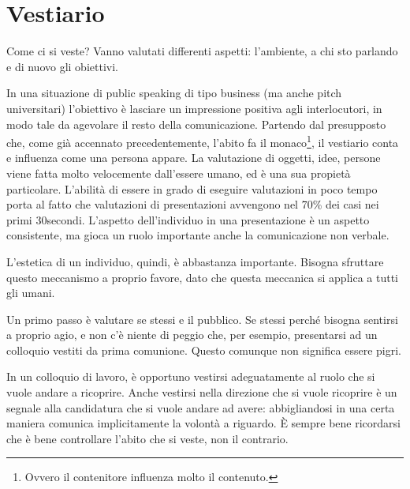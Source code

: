 \section{Vestiario}

Come ci si veste? Vanno valutati differenti aspetti: l'ambiente, a chi sto
parlando e di nuovo gli obiettivi.

In una situazione di public speaking di tipo business (ma anche pitch
universitari) l'obiettivo è lasciare un impressione positiva agli
interlocutori, in modo tale da agevolare il resto della comunicazione. Partendo
dal presupposto che, come già accennato precedentemente, l'abito fa il
monaco\footnote{Ovvero il contenitore influenza molto il contenuto.}, il
vestiario conta e influenza come una persona appare. La valutazione di oggetti,
idee, persone viene fatta molto velocemente dall'essere umano, ed è una sua
propietà particolare. L'abilità di essere in grado di eseguire valutazioni in
poco tempo porta al fatto che valutazioni di presentazioni avvengono nel 70\%
dei casi nei primi 30secondi. L'aspetto dell'individuo in una presentazione è
un aspetto consistente, ma gioca un ruolo importante anche la comunicazione non
verbale.

L'estetica di un individuo, quindi, è abbastanza importante. Bisogna sfruttare
questo meccanismo a proprio favore, dato che questa meccanica si applica a tutti
gli umani.

Un primo passo è valutare se stessi e il pubblico. Se stessi perché bisogna
sentirsi a proprio agio, e non c'è niente di peggio che, per esempio,
presentarsi ad un colloquio vestiti da prima comunione. Questo comunque non
significa essere pigri.

In un colloquio di lavoro, è opportuno vestirsi adeguatamente al ruolo che si
vuole andare a ricoprire. Anche vestirsi nella direzione che si vuole ricoprire
è un segnale alla candidatura che si vuole andare ad avere: abbigliandosi in
una certa maniera comunica implicitamente la volontà a riguardo. È sempre bene
ricordarsi che è bene controllare l'abito che si veste, non il contrario.
